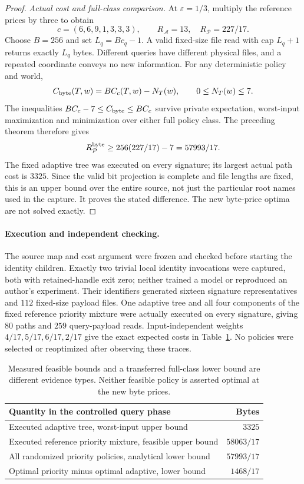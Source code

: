 \begin{proof}
\emph{Actual cost and full-class comparison.} At $\varepsilon=1/3$, multiply the reference prices by three to obtain
\[
 c=(6,6,9,1,3,3,3),\qquad R_{\mathcal A}=13,
 \quad R_{\mathcal P}=227/17.
\]
Choose $B=256$ and set $L_q=Bc_q-1$. A valid fixed-size file read with cap $L_q+1$ returns exactly $L_q$ bytes. Different queries have different physical files, and a repeated coordinate conveys no new information. For any deterministic policy and world,
\[
 C_{\rm byte}(T,w)=B C_c(T,w)-N_T(w),\qquad0\leq N_T(w)\leq7.
\]
The inequalities $BC_c-7\leq C_{\rm byte}\leq BC_c$ survive private expectation, worst-input maximization and minimization over either full policy class. The preceding theorem therefore gives
\[
 R^{\rm byte}_{\mathcal P}\geq256(227/17)-7=57993/17.
\]
The fixed adaptive tree was executed on every signature; its largest actual path cost is $3325$. Since the valid bit projection is complete and file lengths are fixed, this is an upper bound over the entire source, not just the particular root names used in the capture. It proves the stated difference. The new byte-price optima are not solved exactly.
\end{proof}

\paragraph*{Execution and independent checking.}
The source map and cost argument were frozen and checked before starting the identity children. Exactly two trivial local identity invocations were captured, both with retained-handle exit zero; neither trained a model or reproduced an author's experiment. Their identifiers generated sixteen signature representatives and $112$ fixed-size payload files. One adaptive tree and all four components of the fixed reference priority mixture were actually executed on every signature, giving $80$ paths and $259$ query-payload reads. Input-independent weights $4/17,5/17,6/17,2/17$ give the exact expected costs in Table~\ref{tab:controlled-lineage-byte-costs}. No policies were selected or reoptimized after observing these traces.

\begin{table}[ht]
\centering\small
\begin{tabular}{@{}p{.52\linewidth}r@{}}\toprule
Quantity in the controlled query phase & Bytes\\\midrule
Executed adaptive tree, worst-input upper bound & $3325$\\
Executed reference priority mixture, feasible upper bound & $58063/17$\\
All randomized priority policies, analytical lower bound & $57993/17$\\
Optimal priority minus optimal adaptive, lower bound & $1468/17$\\\bottomrule
\end{tabular}
\caption{Measured feasible bounds and a transferred full-class lower bound are different evidence types. Neither feasible policy is asserted optimal at the new byte prices.}
\label{tab:controlled-lineage-byte-costs}
\end{table}

